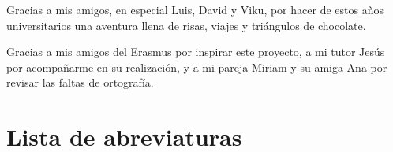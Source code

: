 \documentclass[12pt]{report} %
\begin{document}
Gracias a mis amigos, en especial Luis, David y Viku, por hacer de estos años universitarios una aventura llena de risas, viajes y triángulos de chocolate.

Gracias a mis amigos del Erasmus por inspirar este proyecto, a mi tutor Jesús por acompañarme en su realización, y a mi pareja Miriam y su amiga Ana por revisar las faltas de ortografía.
\setcounter{page}{5}



	\vfill

	\newpage %
	\thispagestyle{empty}
	\mbox{}



\tableofcontents
\thispagestyle{fancy}

\newpage %
\thispagestyle{empty}
\mbox{}

\listoffigures
\thispagestyle{fancy}

\newpage %
\thispagestyle{empty}
\mbox{}

\listoftables
\thispagestyle{fancy}

\newpage %
\thispagestyle{empty}
\mbox{}

\chapter*{Lista de abreviaturas}
\end{document}

